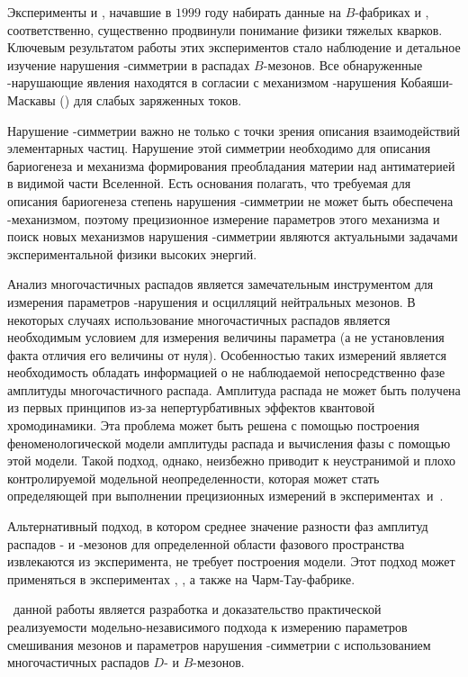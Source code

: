 {\actuality} Эксперименты \belle и \babar, начавшие в $1999$ году набирать данные на $B$-фабриках \kekb и \pepii, соответственно, существенно продвинули понимание физики тяжелых кварков.  Ключевым результатом работы этих экспериментов стало наблюдение и детальное изучение нарушения \cpconj-симметрии в распадах $B$-мезонов.  Все обнаруженные \cpconj-нарушающие явления находятся в согласии с механизмом \cpconj-нарушения Кобаяши-Маскавы (\km) для слабых заряженных токов.

Нарушение \cpconj-симметрии важно не только с точки зрения описания взаимодействий элементарных частиц. Нарушение этой симметрии необходимо для описания бариогенеза и механизма формирования преобладания материи над антиматерией в видимой части Вселенной.  Есть основания полагать, что требуемая для описания бариогенеза степень нарушения \cpconj-симметрии не может быть обеспечена \km-механизмом, поэтому прецизионное измерение параметров этого механизма и поиск новых механизмов нарушения \cpconj-симметрии являются актуальными задачами экспериментальной физики высоких энергий.

Анализ многочастичных распадов является замечательным инструментом для измерения параметров \cpconj-нарушения и осцилляций нейтральных мезонов.  В некоторых случаях использование многочастичных распадов является необходимым условием для измерения величины параметра (а не установления факта отличия его величины от нуля).  Особенностью таких измерений является необходимость обладать информацией о не наблюдаемой непосредственно фазе амплитуды многочастичного распада.  Амплитуда распада не может быть получена из первых принципов из-за непертурбативных эффектов квантовой хромодинамики.  Эта проблема может быть решена с помощью построения феноменологической модели амплитуды распада и вычисления фазы с помощью этой модели.  
Такой подход, однако, неизбежно приводит к неустранимой и плохо контролируемой модельной неопределенности, которая может стать определяющей при выполнении прецизионных измерений в экспериментах~\lhcb и~\belleii.

Альтернативный подход, в котором среднее значение разности фаз амплитуд распадов \dn- и \dnbar-мезонов для определенной области фазового пространства извлекаются из эксперимента, не требует построения модели.  Этот подход может применяться в экспериментах \lhcb, \belleii, а также на Чарм-Тау-фабрике.

\aim\ данной работы является разработка и доказательство практической реализуемости модельно-независимого подхода к измерению параметров смешивания мезонов и параметров нарушения \cpconj-симметрии с использованием многочастичных распадов $D$- и $B$-мезонов.

